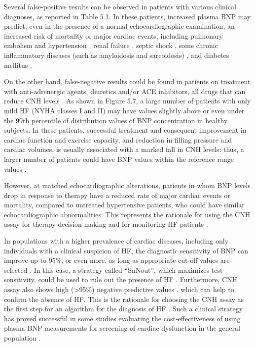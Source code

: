 \documentclass[14pt,a4paper,onecolumn]{extarticle}
\begin{document}
Several false-positive results can be observed in patients with various clinical diagnoses, as reported in Table 5.1. In these patients, increased plasma BNP may predict, even in the presence of a normal echocardiographic examination, an increased risk of mortality or major cardiac events, including pulmonary embolism \citep{bib380} \citep{bib381} \citep{bib382} and hypertension \citep{bib383}, renal failure \citep{bib384} \citep{bib385}, septic shock \citep{bib386}, some chronic inflammatory diseases (such as amyloidosis and sarcoidosis) \citep{bib387} \citep{bib388}, and diabetes mellitus \citep{bib389}.

On the other hand, false-negative results could be found in patients on treatment with anti-adrenergic agents, diuretics and/or ACE inhibitors, all drugs that can reduce CNH levels \citep{bib35}. As shown in Figure 5.7, a large number of patients with only mild HF (NYHA classes I and II) may have values slightly above or even under the 99th percentile of distribution values of BNP concentration in healthy subjects. In these patients, successful treatment and consequent improvement in cardiac function and exercise capacity, and reduction in filling pressure and cardiac volumes, is usually associated with a marked fall in CNH levels: thus, a larger number of patients could have BNP values within the reference range values \citep{bib35} \citep{bib390}.

However, at matched echocardiographic alterations, patients in whom BNP levels drop in response to therapy have a reduced rate of major cardiac events or mortality, compared to untreated hypertensive patients, who could have similar echocardiographic abnormalities. This represents the rationale for using the CNH assay for therapy decision making and for monitoring HF patients \citep{bib35} \citep{bib361} \citep{bib362} \citep{bib363} \citep{bib364} \citep{bib365}.

In populations with a higher prevalence of cardiac diseases, including only individuals with a clinical suspicion of HF, the diagnostic sensitivity of BNP can improve up to 95\%, or even more, as long as appropriate cut-off values are selected \citep{bib35} \citep{bib372}. In this case, a strategy called “SnNout”, which maximizes test sensitivity, could be used to rule out the presence of HF \citep{bib391}. Furthermore, CNH assay also shows high (>95\%) negative predictive values \citep{bib35} \citep{bib320}, which can help to confirm the absence of HF. This is the rationale for choosing the CNH assay as the first step for an algorithm for the diagnosis of HF \citep{bib369} \citep{bib370}. Such a clinical strategy has proved successful in some  studies evaluating the cost-effectiveness of using plasma BNP measurements for screening of cardiac dysfunction in the general population \citep{bib392} \citep{bib393} \citep{bib3171}.
\end{document}
